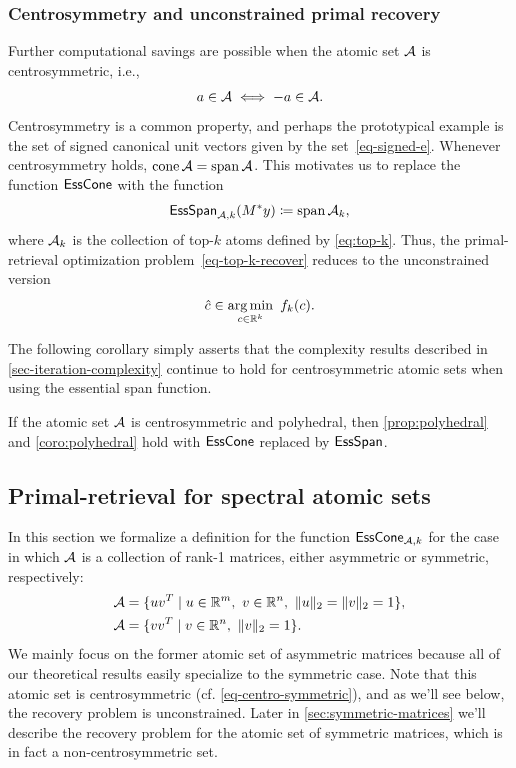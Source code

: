\subsubsection{Centrosymmetry and unconstrained primal recovery}

Further computational savings are possible when the atomic set $\mathcal{A}$ is centrosymmetric, i.e.,
\begin{equation}\label{eq-centro-symmetric}
  a\in\mathcal{A} \iff -a\in\mathcal{A}.
\end{equation}
Centrosymmetry is a common property, and perhaps the prototypical example is the set of signed canonical unit vectors given by the set~\eqref{eq-signed-e}. Whenever centrosymmetry holds, $\operatorname{cone}\mathcal{A}=\operatorname{span}\mathcal{A}$. This motivates us to replace the function $\operatorname{\sf EssCone}$ with the function
\[
  \operatorname{\sf EssSpan}_{\mathcal{A}, k}(M^*y) \coloneqq \operatorname{span}\mathcal{A}_k,
\]
where $\mathcal{A}_k$ is the collection of top-$k$ atoms defined by \autoref{eq:top-k}. Thus, the primal-retrieval optimization problem~\eqref{eq-top-k-recover} reduces to the unconstrained version
\begin{equation} \label{eq:primal_recover_polyhedral2}
  \hat c \in \underset{c \in \mathbb{R}^k}{\textrm{arg}\,{\min}}\enskip f_k(c).
\end{equation}

The following corollary simply asserts that the complexity results described in \autoref{sec-iteration-complexity} continue to hold for centrosymmetric atomic sets when using the essential span function.
\begin{corollary}
    If the atomic set $\mathcal{A}$ is centrosymmetric and polyhedral, then \autoref{prop:polyhedral} and \autoref{coro:polyhedral} hold with $\operatorname{\sf EssCone}$ replaced by $\operatorname{\sf EssSpan}$. 
\end{corollary}


\subsection{Primal-retrieval for spectral atomic sets} \label{sec:spectral}

In this section we formalize a definition for the function $\operatorname{\sf EssCone}_{\mathcal{A}, k}$ for the case in which $\mathcal{A}$ is a collection of rank-1 matrices, either asymmetric or symmetric, respectively:
\begin{align} \label{eq:asymmetric}
    \mathcal{A} &= \{uv^T \mid u \in \mathbb{R}^m,\ v \in \mathbb{R}^n,\ \|u\|_2=\|v\|_2 = 1\}, \\ \label{eq:symmetric}
    \mathcal{A} &= \{vv^T \mid v \in \mathbb{R}^n,\ \|v\|_2 = 1\}.
\end{align}
We mainly focus on the former atomic set of asymmetric matrices because all of our theoretical results easily specialize to the symmetric case. Note that this atomic set is centrosymmetric (cf. \autoref{eq-centro-symmetric}), and as we'll see below, the recovery problem is unconstrained. Later in \autoref{sec:symmetric-matrices} we'll describe the recovery problem for the atomic set of symmetric matrices, which is in fact a non-centrosymmetric set.

